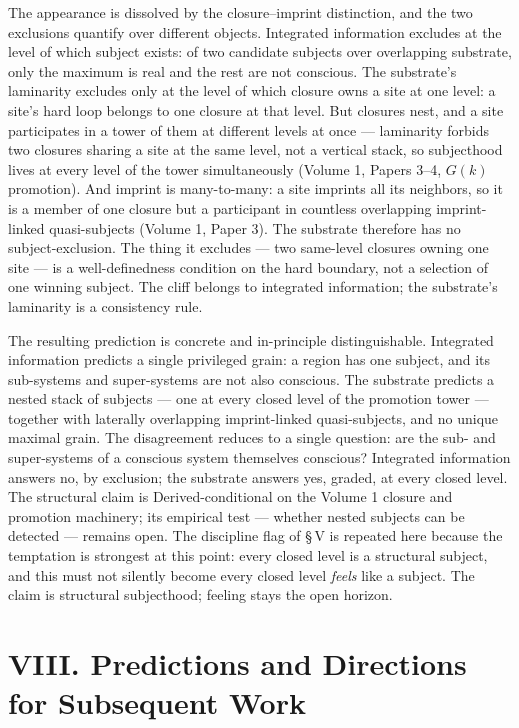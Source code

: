 \documentclass[11pt,oneside]{report}
\theoremstyle{definition}
\theoremstyle{remark}
\begin{document}
The appearance is dissolved by the closure--imprint distinction, and the
two exclusions quantify over different objects. Integrated information
excludes at the level of which subject exists: of two candidate subjects
over overlapping substrate, only the maximum is real and the rest are not
conscious. The substrate's laminarity excludes only at the level of which
closure owns a site at one level: a site's hard loop belongs to one
closure at that level. But closures nest, and a site participates in a
tower of them at different levels at once --- laminarity forbids two
closures sharing a site at the same level, not a vertical stack, so
subjecthood lives at every level of the tower simultaneously (Volume 1,
Papers 3--4, \ensuremath{G(k)} promotion). And imprint is many-to-many: a
site imprints all its neighbors, so it is a member of one closure but a
participant in countless overlapping imprint-linked quasi-subjects (Volume
1, Paper 3). The substrate therefore has no subject-exclusion. The thing
it excludes --- two same-level closures owning one site --- is a
well-definedness condition on the hard boundary, not a selection of one
winning subject. The cliff belongs to integrated information; the
substrate's laminarity is a consistency rule.

The resulting prediction is concrete and in-principle distinguishable.
Integrated information predicts a single privileged grain: a region has
one subject, and its sub-systems and super-systems are not also
conscious. The substrate predicts a nested stack of subjects --- one at
every closed level of the promotion tower --- together with laterally
overlapping imprint-linked quasi-subjects, and no unique maximal grain.
The disagreement reduces to a single question: are the sub- and
super-systems of a conscious system themselves conscious? Integrated
information answers no, by exclusion; the substrate answers yes, graded,
at every closed level. The structural claim is Derived-conditional on the
Volume 1 closure and promotion machinery; its empirical test --- whether
nested subjects can be detected --- remains open. The discipline flag of
\S\,V is repeated here because the temptation is strongest at this point:
every closed level is a structural subject, and this must not silently
become every closed level \emph{feels} like a subject. The claim is
structural subjecthood; feeling stays the open horizon.

\section*{VIII. Predictions and Directions for Subsequent Work}
\end{document}
